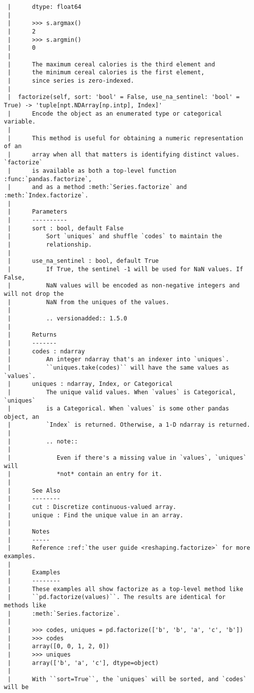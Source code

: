 \documentclass[
  letterpaper,
  DIV=11,
  numbers=noendperiod]{scrreprt}
\begin{document}
\begin{verbatim}
 |      dtype: float64
 |      
 |      >>> s.argmax()
 |      2
 |      >>> s.argmin()
 |      0
 |      
 |      The maximum cereal calories is the third element and
 |      the minimum cereal calories is the first element,
 |      since series is zero-indexed.
 |  
 |  factorize(self, sort: 'bool' = False, use_na_sentinel: 'bool' = True) -> 'tuple[npt.NDArray[np.intp], Index]'
 |      Encode the object as an enumerated type or categorical variable.
 |      
 |      This method is useful for obtaining a numeric representation of an
 |      array when all that matters is identifying distinct values. `factorize`
 |      is available as both a top-level function :func:`pandas.factorize`,
 |      and as a method :meth:`Series.factorize` and :meth:`Index.factorize`.
 |      
 |      Parameters
 |      ----------
 |      sort : bool, default False
 |          Sort `uniques` and shuffle `codes` to maintain the
 |          relationship.
 |      
 |      use_na_sentinel : bool, default True
 |          If True, the sentinel -1 will be used for NaN values. If False,
 |          NaN values will be encoded as non-negative integers and will not drop the
 |          NaN from the uniques of the values.
 |      
 |          .. versionadded:: 1.5.0
 |      
 |      Returns
 |      -------
 |      codes : ndarray
 |          An integer ndarray that's an indexer into `uniques`.
 |          ``uniques.take(codes)`` will have the same values as `values`.
 |      uniques : ndarray, Index, or Categorical
 |          The unique valid values. When `values` is Categorical, `uniques`
 |          is a Categorical. When `values` is some other pandas object, an
 |          `Index` is returned. Otherwise, a 1-D ndarray is returned.
 |      
 |          .. note::
 |      
 |             Even if there's a missing value in `values`, `uniques` will
 |             *not* contain an entry for it.
 |      
 |      See Also
 |      --------
 |      cut : Discretize continuous-valued array.
 |      unique : Find the unique value in an array.
 |      
 |      Notes
 |      -----
 |      Reference :ref:`the user guide <reshaping.factorize>` for more examples.
 |      
 |      Examples
 |      --------
 |      These examples all show factorize as a top-level method like
 |      ``pd.factorize(values)``. The results are identical for methods like
 |      :meth:`Series.factorize`.
 |      
 |      >>> codes, uniques = pd.factorize(['b', 'b', 'a', 'c', 'b'])
 |      >>> codes
 |      array([0, 0, 1, 2, 0])
 |      >>> uniques
 |      array(['b', 'a', 'c'], dtype=object)
 |      
 |      With ``sort=True``, the `uniques` will be sorted, and `codes` will be

\end{verbatim}
\end{document}
